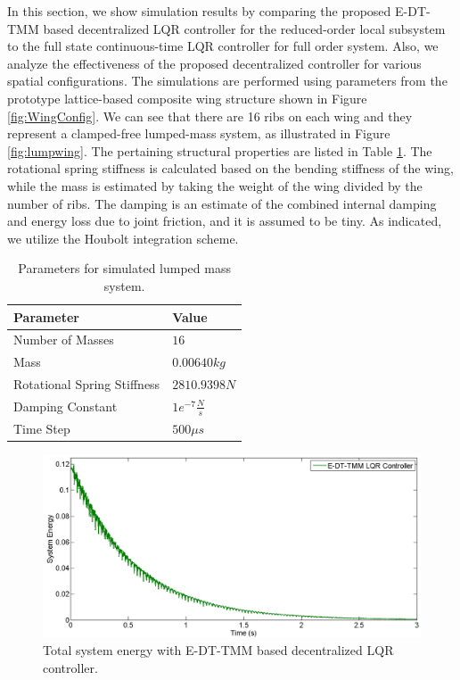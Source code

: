 \documentclass[11pt]{ucthesis}
\begin{document}
In this section, we show simulation results by comparing the proposed E-DT-TMM based decentralized LQR controller for the reduced-order local subsystem to the full state continuous-time LQR controller for full order system. Also, we analyze the effectiveness of the proposed decentralized controller for various spatial configurations. The simulations are performed using parameters from the prototype lattice-based composite wing structure shown in Figure \ref{fig:WingConfig}. We can see that there are 16 ribs on each wing and they represent a clamped-free lumped-mass system, as illustrated in Figure \ref{fig:lumpwing}. The pertaining structural properties are listed in Table \ref{t:beam}. The rotational spring stiffness is calculated based on the bending stiffness of the wing, while the mass is estimated by taking the weight of the wing divided by the number of ribs. The damping is an estimate of the combined internal damping and energy loss due to joint friction, and it is assumed to be tiny. As indicated, we utilize the Houbolt integration scheme. 

\begin{table}
\begin{center}
\caption{Parameters for simulated lumped mass system.}
\label{t:beam}
\begin{tabular}{  p{5cm} p{1.9cm}}
Parameter&Value\\\hline
Number of Masses&$16$\\
Mass&$0.00640 kg$\\
Rotational Spring Stiffness&$2810.9398 N$\\
Damping Constant&$1e^{-7}\frac{N}{s}$\\
Time Step&$500 \mu s$\\
\end{tabular}
\end{center}
\end{table}

\begin{figure}[thpb]
\centering
\includegraphics[width=0.8\linewidth]{Figures/Mass9Controller_1.png}
\caption{Total system energy with E-DT-TMM based decentralized LQR controller.}
\label{fig:DTTMM9}
\end{figure}
\end{document}

